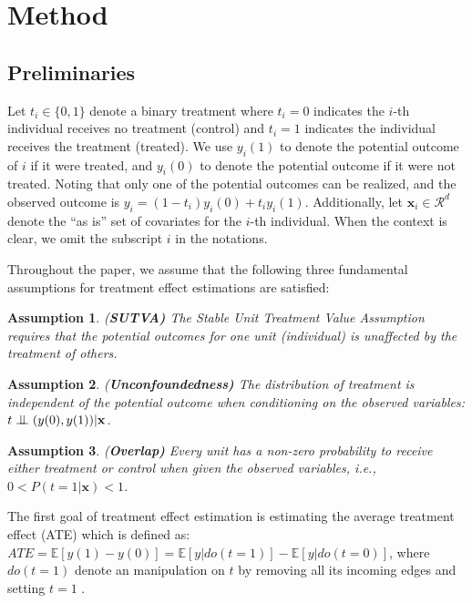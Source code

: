 \documentclass[letterpaper]{article} %
\newcommand{\bigCI}{\mathrel{\text{\scalebox{1.07}{$\perp\mkern-10mu\perp$}}}}
\begin{document}
\section*{Method}

\subsection*{Preliminaries}
Let $t_i \in \{0,1\}$ denote a binary treatment where $t_i = 0$ indicates the $i$-th individual receives no treatment (control) and $t_i = 1$ indicates the individual receives the treatment (treated). We use $y_i(1)$ to denote the potential outcome of $i$ if it were treated, and $y_i(0)$ to denote the potential outcome if it were not treated. Noting that only one of the potential outcomes can be realized, and the observed outcome is $y_i = (1-t_i)y_i(0) + t_i y_i(1)$. Additionally, let $\mathbf{x}_i \in \mathcal{R}^d$ denote the ``as is'' set of covariates for the $i$-th individual. When the context is clear, we omit the subscript $i$ in the notations.

Throughout the paper, we assume that the following three fundamental assumptions for treatment effect estimations \cite{Rosenbaum1983} are satisfied:
\newtheorem{assumption}{Assumption}
\begin{assumption}
(\textbf{SUTVA)} The Stable Unit Treatment Value Assumption requires that the potential outcomes for one unit (individual) is unaffected by the treatment of others.
\end{assumption}

\begin{assumption}
(\textbf{Unconfoundedness)} The distribution of treatment is independent of the potential outcome when conditioning on the observed variables: $t \bigCI (y(0), y(1)) | \mathbf{x}$.
\label{unconfound}
\end{assumption}

\begin{assumption}
(\textbf{Overlap)} Every unit has a non-zero probability to receive either treatment or control when given the observed variables, i.e., $0< P(t=1|\mathbf{x})<1$.
\label{overslap}
\end{assumption}

The first goal of treatment effect estimation is estimating the average treatment effect (ATE) which is defined as: $ATE = \mathbb{E}[y(1) - y(0)] = \mathbb{E}[y|do(t=1)] - \mathbb{E}[y|do(t=0)]$,
where $do(t=1)$ denote an manipulation on $t$ by removing all its incoming edges and setting $t=1$ \cite{Pearl2009}.
\end{document}
